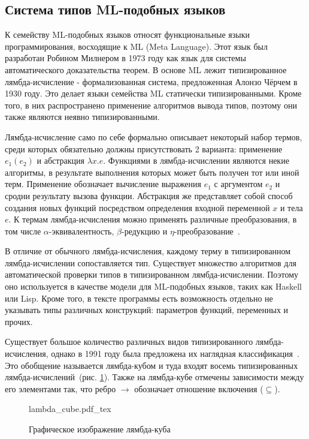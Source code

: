 \subsection{Система типов ML-подобных языков}
\label{subsec:ml_type_system}

К семейству ML-подобных языков относят функциональные языки программирования, восходящие к ML (Meta Language).
Этот язык был разработан Робином Милнером в 1973 году как язык для системы автоматического доказательства теорем.
В основе ML лежит типизированное лямбда-исчисление - формализованная система, предложенная Алонзо Чёрчем в 1930 году.
Это делает языки семейства ML статически типизированными.
Кроме того, в них распространено применение алгоритмов вывода типов, поэтому они также являются неявно типизированными.


Лямбда-исчисление само по себе формально описывает некоторый набор термов, среди которых обязательно должны присутствовать 2 варианта: применение $e_1(e_2)$ и абстракция $\lambda x. e$.
Функциями в лямбда-исчислении являются некие алгоритмы, в результате выполнения которых может быть получен тот или иной терм.
Применение обозначает вычисление выражения $e_1$ с аргументом $e_2$ и сродни результату вызова функции.
Абстракция же представляет собой способ создания новых функций посредством определения входной переменной $x$ и тела $e$.
К термам лямбда-исчисления можно применять различные преобразования, в том числе $\alpha$-эквивалентность, $\beta$-редукцию и $\eta$-преобразование~\cite{LambdaCalculus}.

В отличие от обычного лямбда-исчисления, каждому терму в типизированном лямбда-исчислении сопоставляется тип.
Существует множество алгоритмов для автоматической проверки типов в типизированном лямбда-исчислении.
Поэтому оно используется в качестве модели для ML-подобных языков, таких как Haskell или Lisp.
Кроме того, в тексте программы есть возможность отдельно не указывать типы различных конструкций: параметров функций, переменных и прочих.

Существует большое количество различных видов типизированного лямбда-исчисления, однако в 1991 году была предложена их наглядная классификация~\cite{LambdaCalculusWithTypes}.
Это обобщение называется лямбда-кубом и туда входят восемь типизированных лямбда-исчислений~(рис. \ref{fig:lambda_cube}).
Также на лямбда-кубе отмечены зависимости между его элементами так, что ребро $\to$ обозначает отношение включения ($\subseteq$).

\begin{figure}[H]
    \centering
    {lambda_cube.pdf_tex}
    \caption{Графическое изображение лямбда-куба}
    \label{fig:lambda_cube}
\end{figure}

